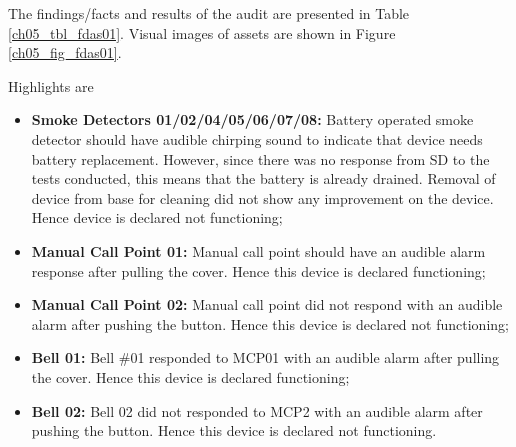 The findings/facts and results of the audit are presented in Table \ref{ch05_tbl_fdas01}. Visual images of assets are shown in Figure \ref{ch05_fig_fdas01}. 

Highlights are

\begin{itemize}
	\item \textbf{Smoke Detectors 01/02/04/05/06/07/08:} Battery operated smoke detector should have audible chirping sound to indicate that device needs battery replacement. However, since there was no response from SD to the tests conducted, this means that the battery is already drained. Removal of device from base for cleaning did not show any improvement on the device. Hence device is declared not functioning;

	\item \textbf{Manual Call Point 01:} Manual call point should have an audible alarm response after pulling the cover. Hence this device is declared functioning;

	\item \textbf{Manual Call Point 02:} Manual call point did not respond with an audible alarm after pushing the button. Hence this device is declared not functioning; 

	\item \textbf{Bell 01:} Bell \#01 responded to MCP01  with an audible alarm after pulling the cover. Hence this device is declared functioning;

	\item \textbf{Bell 02:} Bell 02 did not responded to MCP2  with an audible alarm after pushing the button. Hence this device is declared not functioning.


\end{itemize}

